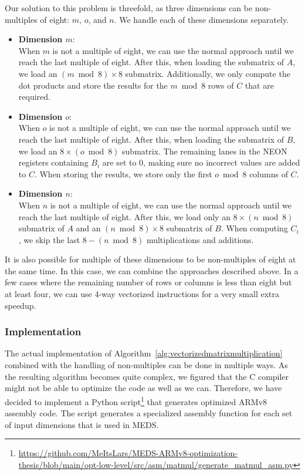 \documentclass[11pt,a4paper]{report}
\theoremstyle{definition}
\begin{document}
Our solution to this problem is threefold, as three dimensions can be non-multiples of eight: $m$, $o$, and $n$. We handle each of these dimensions separately.
\begin{itemize}
  \item \textbf{Dimension $m$}:\\
        When $m$ is not a multiple of eight, we can use the normal approach until we reach the last multiple of eight. After this, when loading the submatrix of $A$, we load an $(m \bmod 8) \times 8$ submatrix. Additionally, we only compute the dot products and store the results for the $m \bmod 8$ rows of $C$ that are required.
  \item \textbf{Dimension $o$}:\\
        When $o$ is not a multiple of eight, we can use the normal approach until we reach the last multiple of eight. After this, when loading the submatrix of $B$, we load an $8 \times (o \bmod 8)$ submatrix. The remaining lanes in the NEON registers containing $B_i$ are set to 0, making sure no incorrect values are added to $C$. When storing the results, we store only the first $o \bmod 8$ columns of $C$.
  \item \textbf{Dimension $n$}:\\
        When $n$ is not a multiple of eight, we can use the normal approach until we reach the last multiple of eight. After this, we load only an $8 \times (n \bmod 8)$ submatrix of $A$ and an $(n \bmod 8) \times 8$ submatrix of $B$. When computing $C_i$, we skip the last $8 - (n \bmod 8)$ multiplications and additions.
\end{itemize}
It is also possible for multiple of these dimensions to be non-multiples of eight at the same time. In this case, we can combine the approaches described above. In a few cases where the remaining number of rows or columns is less than eight but at least four, we can use 4-way vectorized instructions for a very small extra speedup.

\subsubsection{Implementation}
The actual implementation of Algorithm~\ref{alg:vectorizedmatrixmultiplication} combined with the handling of non-multiples can be done in multiple ways. As the resulting algorithm becomes quite complex, we figured that the C compiler might not be able to optimize the code as well as we can. Therefore, we have decided to implement a Python script\footnote{\url{https://github.com/MeItsLars/MEDS-ARMv8-optimization-thesis/blob/main/opt-low-level/src/asm/matmul/generate\_matmul\_asm.py}} that generates optimized ARMv8 assembly code. The script generates a specialized assembly function for each set of input dimensions that is used in MEDS.
\end{document}
